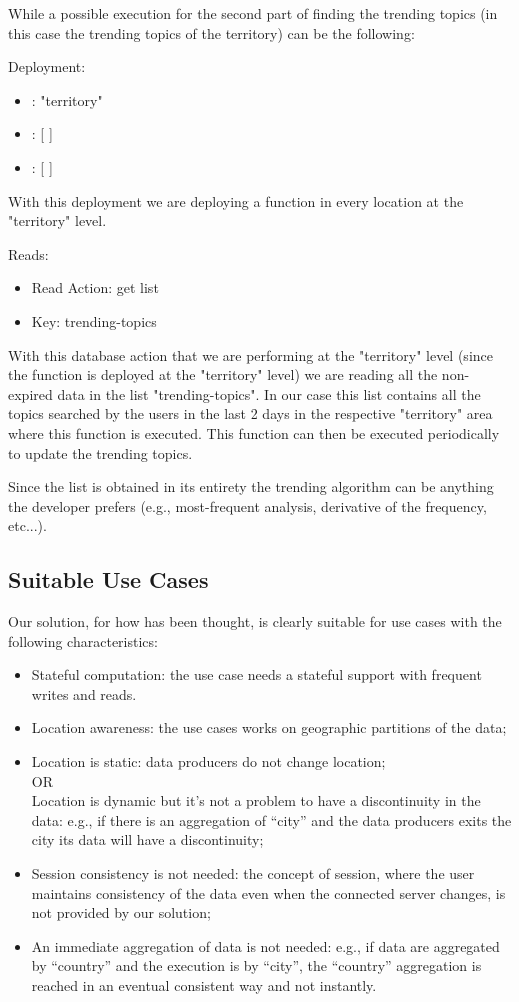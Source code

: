 While a possible execution for the second part of finding the trending topics (in this case the trending topics of the territory) can be the following:
\begin{example}
Deployment:
\begin{itemize}
    \item {}: "territory"
    \item {}: [ ]
    \item {}: [ ]
\end{itemize}
With this deployment we are deploying a function in every location at the "territory" level.

Reads:
\begin{itemize}
    \item Read Action: get list
    \item Key: trending-topics
\end{itemize}
With this database action that we are performing at the "territory" level (since the function is deployed at the "territory" level) we are reading all the non-expired data in the list "trending-topics". In our case this list contains all the topics searched by the users in the last 2 days in the respective "territory" area where this function is executed. This function can then be executed periodically to update the trending topics.

Since the list is obtained in its entirety the trending algorithm can be anything the developer prefers (e.g., most-frequent analysis, derivative of the frequency, etc...).
\end{example}


\subsection{Suitable Use Cases}
Our solution, for how has been thought, is clearly suitable for use cases with the following characteristics:
\begin{itemize}
    \item Stateful computation: the use case needs a stateful support with frequent writes and reads.
    \item Location awareness: the use cases works on geographic partitions of the data;
    \item Location is static: data producers do not change location;\\OR\\Location is dynamic but it’s not a problem to have a discontinuity in the data: e.g., if there is an aggregation of “city” and the data producers exits the city its data will have a discontinuity;
    \item Session consistency is not needed: the concept of session, where the user maintains consistency of the data even when the connected server changes, is not provided by our solution;
    \item An immediate aggregation of data is not needed: e.g., if data are aggregated by “country” and the execution is by “city”, the “country” aggregation is reached in an eventual consistent way and not instantly.
\end{itemize}
